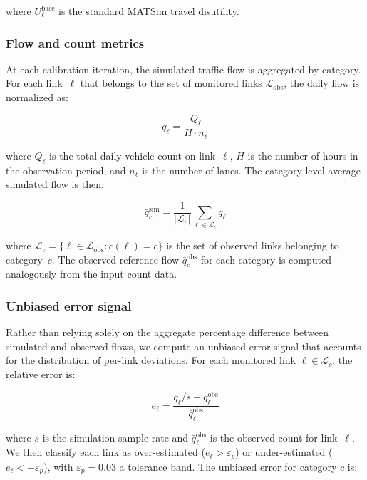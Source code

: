 \noindent where $U_\ell^{\text{base}}$ is the standard MATSim travel disutility.

\subsubsection{Flow and count metrics}

At each calibration iteration, the simulated traffic flow is aggregated by category. For each link~$\ell$ that belongs to the set of monitored links $\mathcal{L}_{\text{obs}}$, the daily flow is normalized as:

\begin{equation}
    q_\ell = \frac{Q_\ell}{H \cdot n_\ell}
    \label{eq:flow_normalization}
\end{equation}

\noindent where $Q_\ell$ is the total daily vehicle count on link~$\ell$, $H$ is the number of hours in the observation period, and $n_\ell$ is the number of lanes. The category-level average simulated flow is then:

\begin{equation}
    \bar{q}_c^{\text{sim}} = \frac{1}{|\mathcal{L}_c|} \sum_{\ell \in \mathcal{L}_c} q_\ell
    \label{eq:avg_flow}
\end{equation}

\noindent where $\mathcal{L}_c = \{\ell \in \mathcal{L}_{\text{obs}} : c(\ell) = c\}$ is the set of observed links belonging to category~$c$. The observed reference flow $\bar{q}_c^{\text{obs}}$ for each category is computed analogously from the input count data.

\subsubsection{Unbiased error signal}

Rather than relying solely on the aggregate percentage difference between simulated and observed flows, we compute an unbiased error signal that accounts for the distribution of per-link deviations. For each monitored link $\ell \in \mathcal{L}_c$, the relative error is:

\begin{equation}
    e_\ell = \frac{q_\ell / s - \bar{q}_\ell^{\text{obs}}}{\bar{q}_\ell^{\text{obs}}}
\end{equation}

\noindent where $s$ is the simulation sample rate and $\bar{q}_\ell^{\text{obs}}$ is the observed count for link~$\ell$. We then classify each link as over-estimated ($e_\ell > \varepsilon_p$) or under-estimated ($e_\ell < -\varepsilon_p$), with $\varepsilon_p = 0.03$ a tolerance band. The unbiased error for category $c$ is:

